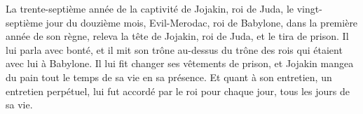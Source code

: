 \begin{multicols}{2}
La trente-septième année de la captivité de Jojakin, roi de Juda, le vingt-septième jour du douzième mois, Evil-Merodac, roi de Babylone, dans la première année de son règne, releva la tête de Jojakin, roi de Juda, et le tira de prison.
Il lui parla avec bonté, et il mit son trône au-dessus du trône des rois qui étaient avec lui à Babylone.
Il lui fit changer ses vêtements de prison, et Jojakin mangea du pain tout le temps de sa vie en sa présence.
Et quant à son entretien, un entretien perpétuel, lui fut accordé par le roi pour chaque jour, tous les jours de sa vie.
\PPE{}
\end{multicols}
